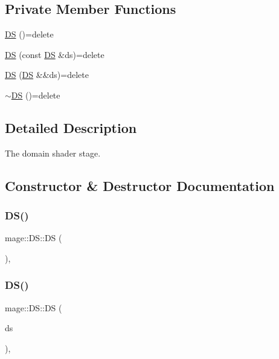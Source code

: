 \subsection*{Private Member Functions}
\begin{DoxyCompactItemize}
\item 
\hyperlink{structmage_1_1_d_s_a0c47d00105eda2bf952ddb1586c4e36e}{DS} ()=delete
\item 
\hyperlink{structmage_1_1_d_s_a6ea6ee57cf0809737091c9f1892638fc}{DS} (const \hyperlink{structmage_1_1_d_s}{DS} \&ds)=delete
\item 
\hyperlink{structmage_1_1_d_s_ae46bd032139843441f0024f40f4291a4}{DS} (\hyperlink{structmage_1_1_d_s}{DS} \&\&ds)=delete
\item 
\hyperlink{structmage_1_1_d_s_aba84e82f4dfdc60a434cdb2b28a5a889}{$\sim$\+DS} ()=delete
\end{DoxyCompactItemize}


\subsection{Detailed Description}
The domain shader stage. 

\subsection{Constructor \& Destructor Documentation}
\hypertarget{structmage_1_1_d_s_a0c47d00105eda2bf952ddb1586c4e36e}{}\label{structmage_1_1_d_s_a0c47d00105eda2bf952ddb1586c4e36e} 
\subsubsection{\texorpdfstring{D\+S()}{DS()}\hspace{0.1cm}{\footnotesize\ttfamily [1/3]}}
{\footnotesize\ttfamily mage\+::\+D\+S\+::\+DS (\begin{DoxyParamCaption}{ }\end{DoxyParamCaption})\hspace{0.3cm}{\ttfamily [private]}, {\ttfamily [delete]}}

\hypertarget{structmage_1_1_d_s_a6ea6ee57cf0809737091c9f1892638fc}{}\label{structmage_1_1_d_s_a6ea6ee57cf0809737091c9f1892638fc} 
\subsubsection{\texorpdfstring{D\+S()}{DS()}\hspace{0.1cm}{\footnotesize\ttfamily [2/3]}}
{\footnotesize\ttfamily mage\+::\+D\+S\+::\+DS (\begin{DoxyParamCaption}\item[{const \hyperlink{structmage_1_1_d_s}{DS} \&}]{ds }\end{DoxyParamCaption})\hspace{0.3cm}{\ttfamily [private]}, {\ttfamily [delete]}}

